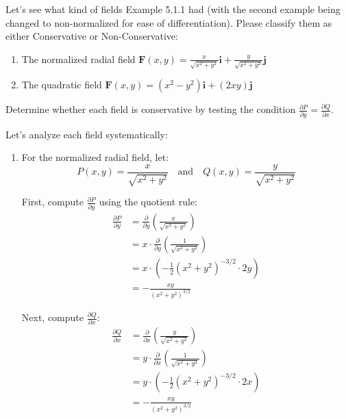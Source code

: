 \exampleline
\begin{example}
Let's see what kind of fields Example 5.1.1 had (with the second example being changed to non-normalized for ease of differentiation). Please classify them as either Conservative or Non-Conservative:

\begin{enumerate}
   \item The normalized radial field $\mathbf{F}(x,y) = \frac{x}{\sqrt{x^2+y^2}}\mathbf{i} + \frac{y}{\sqrt{x^2+y^2}}\mathbf{j}$
   
   \item The quadratic field $\mathbf{F}(x,y) = (x^2-y^2)\mathbf{i} + (2xy)\mathbf{j}$
\end{enumerate}

Determine whether each field is conservative by testing the condition $\frac{\partial P}{\partial y} = \frac{\partial Q}{\partial x}$.

\begin{solution}
Let's analyze each field systematically:

\begin{enumerate}
   \item For the normalized radial field, let:
   \[
   P(x,y) = \frac{x}{\sqrt{x^2+y^2}} \quad \text{and} \quad Q(x,y) = \frac{y}{\sqrt{x^2+y^2}}
   \]
   
   First, compute $\frac{\partial P}{\partial y}$ using the quotient rule:
   \begin{align*}
   \frac{\partial P}{\partial y} &= \frac{\partial}{\partial y}\left(\frac{x}{\sqrt{x^2+y^2}}\right) \\
   &= x \cdot \frac{\partial}{\partial y}\left(\frac{1}{\sqrt{x^2+y^2}}\right) \\
   &= x \cdot \left(-\frac{1}{2}(x^2+y^2)^{-3/2} \cdot 2y\right) \\
   &= -\frac{xy}{(x^2+y^2)^{3/2}}
   \end{align*}
   
   Next, compute $\frac{\partial Q}{\partial x}$:
   \begin{align*}
   \frac{\partial Q}{\partial x} &= \frac{\partial}{\partial x}\left(\frac{y}{\sqrt{x^2+y^2}}\right) \\
   &= y \cdot \frac{\partial}{\partial x}\left(\frac{1}{\sqrt{x^2+y^2}}\right) \\
   &= y \cdot \left(-\frac{1}{2}(x^2+y^2)^{-3/2} \cdot 2x\right) \\
   &= -\frac{xy}{(x^2+y^2)^{3/2}}
   \end{align*}
   

\end{enumerate}
\end{solution}
\end{example}
